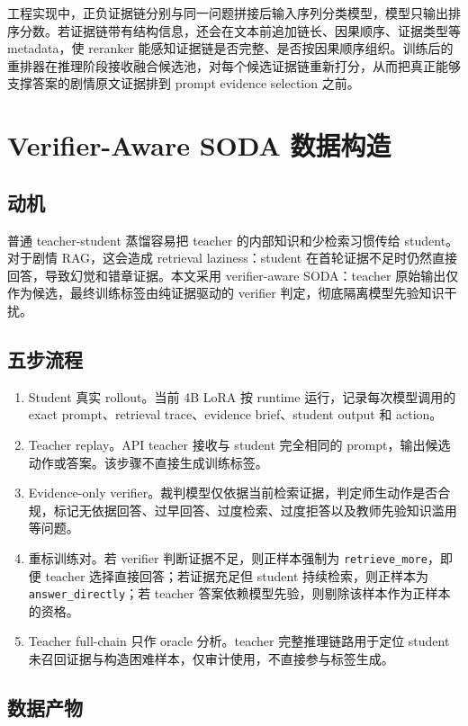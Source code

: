 \documentclass[UTF8,a4paper,12pt]{ctexart}
\newcommand{\code}[1]{\texttt{#1}}
\begin{document}
工程实现中，正负证据链分别与同一问题拼接后输入序列分类模型，模型只输出排序分数。若证据链带有结构信息，还会在文本前追加链长、因果顺序、证据类型等 metadata，使 reranker 能感知证据链是否完整、是否按因果顺序组织。训练后的重排器在推理阶段接收融合候选池，对每个候选证据链重新打分，从而把真正能够支撑答案的剧情原文证据排到 prompt evidence selection 之前。

\section{Verifier-Aware SODA 数据构造}

\subsection{动机}

普通 teacher-student 蒸馏容易把 teacher 的内部知识和少检索习惯传给 student。对于剧情 RAG，这会造成 retrieval laziness：student 在首轮证据不足时仍然直接回答，导致幻觉和错章证据。本文采用 verifier-aware SODA：teacher 原始输出仅作为候选，最终训练标签由纯证据驱动的 verifier 判定，彻底隔离模型先验知识干扰。

\subsection{五步流程}

\begin{enumerate}
  \item Student 真实 rollout。当前 4B LoRA 按 runtime 运行，记录每次模型调用的 exact prompt、retrieval trace、evidence brief、student output 和 action。
  \item Teacher replay。API teacher 接收与 student 完全相同的 prompt，输出候选动作或答案。该步骤不直接生成训练标签。
  \item Evidence-only verifier。裁判模型仅依据当前检索证据，判定师生动作是否合规，标记无依据回答、过早回答、过度检索、过度拒答以及教师先验知识滥用等问题。
  \item 重标训练对。若 verifier 判断证据不足，则正样本强制为 \code{retrieve\_more}，即便 teacher 选择直接回答；若证据充足但 student 持续检索，则正样本为 \code{answer\_directly}；若 teacher 答案依赖模型先验，则剔除该样本作为正样本的资格。
  \item Teacher full-chain 只作 oracle 分析。teacher 完整推理链路用于定位 student 未召回证据与构造困难样本，仅审计使用，不直接参与标签生成。
\end{enumerate}

\subsection{数据产物}
\end{document}

